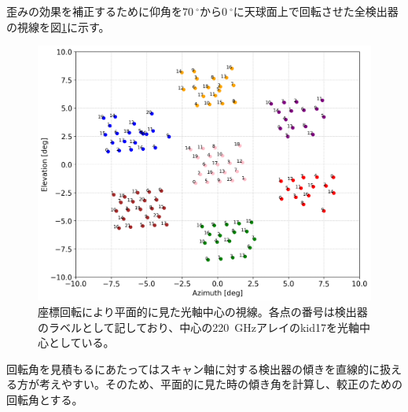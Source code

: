 歪みの効果を補正するために仰角を$\SI{70}{^{\circ}}$から$\SI{0}{^{\circ}}$に天球面上で回転させた全検出器の視線を図\ref{before_full_pos_0}に示す。
\begin{figure}[htbp]
  \centering
  \includegraphics[width=0.9\columnwidth]{5_alignment/figs/before_full_pos.png}
  \caption{座標回転により平面的に見た光軸中心の視線。各点の番号は検出器のラベルとして記しており、中心の\SI{220}{GHz}アレイのkid17を光軸中心としている。}
  \label{before_full_pos_0}
\end{figure}
回転角を見積もるにあたってはスキャン軸に対する検出器の傾きを直線的に扱える方が考えやすい。そのため、平面的に見た時の傾き角を計算し、較正のための回転角とする。


